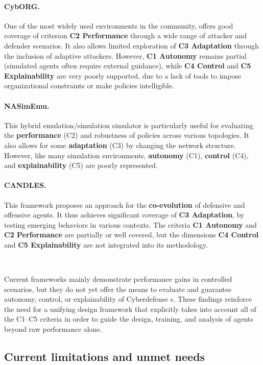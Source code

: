 \paragraph{CybORG.} One of the most widely used environments in the  community,  offers good coverage of criterion \textbf{C2 Performance} through a wide range of attacker and defender scenarios. It also allows limited exploration of \textbf{C3 Adaptation} through the inclusion of adaptive attackers. However, \textbf{C1 Autonomy} remains partial (simulated agents often require external guidance), while \textbf{C4 Control} and \textbf{C5 Explainability} are very poorly supported, due to a lack of tools to impose organizational constraints or make policies intelligible.

\paragraph{NASimEmu.} This hybrid emulation/simulation simulator is particularly useful for evaluating the \textbf{performance} (C2) and robustness of policies across various topologies. It also allows for some \textbf{adaptation} (C3) by changing the network structure. However, like many simulation environments, \textbf{autonomy} (C1), \textbf{control} (C4), and \textbf{explainability} (C5) are poorly represented.

\paragraph{CANDLES.} This framework proposes an approach for the \textbf{co-evolution} of defensive and offensive agents. It thus achieves significant coverage of \textbf{C3 Adaptation}, by testing emerging behaviors in various contexts. The criteria \textbf{C1 Autonomy} and \textbf{C2 Performance} are partially or well covered, but the dimensions \textbf{C4 Control} and \textbf{C5 Explainability} are not integrated into its methodology.

\

\noindent Current frameworks mainly demonstrate performance gains in controlled scenarios, but they do not yet offer the means to evaluate and guarantee autonomy, control, or explainability of Cyberdefense s. These findings reinforce the need for a unifying design framework that explicitly takes into account all of the C1--C5 criteria in order to guide the design, training, and analysis of agents beyond raw performance alone.

\subsection{Current limitations and unmet needs}

